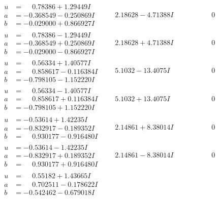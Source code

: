 \documentclass[1p]{elsarticle_modified}
\theoremstyle{definition}
\begin{document}
$$\begin{array}{c|c|c}
\begin{aligned}
u &= \phantom{-}0.78386 + 1.29449 I \\
a &= -0.368549 - 0.250869 I \\
b &= -0.029000 + 0.866927 I\end{aligned}
 & \phantom{-}2.18628 - 4.71388 I & \phantom{-0.000000 } 0 \\ \hline\begin{aligned}
u &= \phantom{-}0.78386 - 1.29449 I \\
a &= -0.368549 + 0.250869 I \\
b &= -0.029000 - 0.866927 I\end{aligned}
 & \phantom{-}2.18628 + 4.71388 I & \phantom{-0.000000 } 0 \\ \hline\begin{aligned}
u &= \phantom{-}0.56334 + 1.40577 I \\
a &= \phantom{-}0.858617 - 0.116384 I \\
b &= -0.798105 - 1.152220 I\end{aligned}
 & \phantom{-}5.1032 - 13.4075 I & \phantom{-0.000000 } 0 \\ \hline\begin{aligned}
u &= \phantom{-}0.56334 - 1.40577 I \\
a &= \phantom{-}0.858617 + 0.116384 I \\
b &= -0.798105 + 1.152220 I\end{aligned}
 & \phantom{-}5.1032 + 13.4075 I & \phantom{-0.000000 } 0 \\ \hline\begin{aligned}
u &= -0.53614 + 1.42235 I \\
a &= -0.832917 - 0.189352 I \\
b &= \phantom{-}0.930177 - 0.916480 I\end{aligned}
 & \phantom{-}2.14861 + 8.38014 I & \phantom{-0.000000 } 0 \\ \hline\begin{aligned}
u &= -0.53614 - 1.42235 I \\
a &= -0.832917 + 0.189352 I \\
b &= \phantom{-}0.930177 + 0.916480 I\end{aligned}
 & \phantom{-}2.14861 - 8.38014 I & \phantom{-0.000000 } 0 \\ \hline\begin{aligned}
u &= \phantom{-}0.55182 + 1.43665 I \\
a &= \phantom{-}0.702511 - 0.178622 I \\
b &= -0.542462 - 0.679018 I\end{aligned}

\end{array}$$
\end{document}
